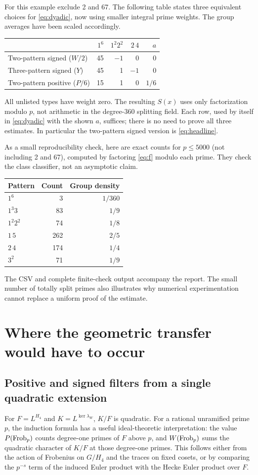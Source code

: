 \documentclass[11pt,letterpaper]{article}
\theoremstyle{remark}\newtheorem{remark}[theorem]{Remark}
\begin{document}
For this example exclude 2 and 67. The following table states three equivalent choices for \eqref{eq:dyadic}, now using smaller integral prime weights. The group averages have been scaled accordingly.
\begin{center}
\begin{tabular}{@{}lrrrr@{}}
\toprule
 & $1^6$ & $1^2 2^2$ & $2\,4$ & $a$\\\midrule
Two-pattern signed ($W/2$)&45&$-1$&0&0\\
Three-pattern signed ($Y$)&45&1&$-1$&0\\
Two-pattern positive ($P/6$)&15&1&0&$1/6$\\\bottomrule
\end{tabular}
\end{center}
All unlisted types have weight zero. The resulting $S(x)$ uses only factorization modulo $p$, not arithmetic in the degree-360 splitting field. Each row, used by itself in \eqref{eq:dyadic} with the shown $a$, suffices; there is no need to prove all three estimates. In particular the two-pattern signed version is \eqref{eq:headline}.

As a small reproducibility check, here are exact counts for $p\le5000$ (not including 2 and 67), computed by factoring \eqref{eq:f} modulo each prime. They check the class classifier, not an asymptotic claim.
\begin{center}
\begin{tabular}{@{}lrr@{}}
\toprule
Pattern & Count & Group density\\\midrule
$1^6$&3&$1/360$\\
$1^3 3$&83&$1/9$\\
$1^2 2^2$&74&$1/8$\\
$1\,5$&262&$2/5$\\
$2\,4$&174&$1/4$\\
$3^2$&71&$1/9$\\\bottomrule
\end{tabular}
\end{center}
The CSV and complete finite-check output accompany the report. The small number of totally split primes also illustrates why numerical experimentation cannot replace a uniform proof of the estimate.

\section{Where the geometric transfer would have to occur}\label{sec:research}
\subsection{Positive and signed filters from a single quadratic extension}
For $F=L^{H_4}$ and $K=L^{\ker\lambda_W}$, $K/F$ is quadratic. For a rational unramified prime $p$, the induction formula has a useful ideal-theoretic interpretation: the value $P(\operatorname{Frob}_p)$ counts degree-one primes of $F$ above $p$, and $W(\operatorname{Frob}_p)$ sums the quadratic character of $K/F$ at those degree-one primes. This follows either from the action of Frobenius on $G/H_4$ and the traces on fixed cosets, or by comparing the $p^{-s}$ term of the induced Euler product with the Hecke Euler product over $F$.
\end{document}
